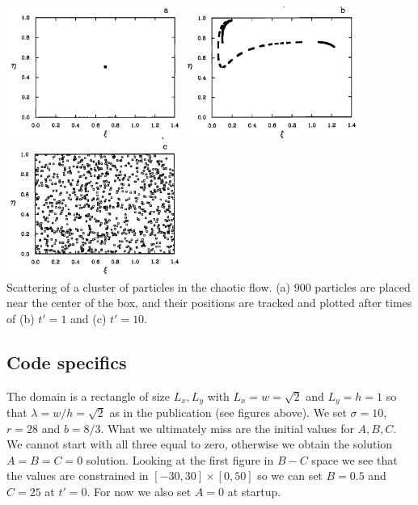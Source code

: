 \begin{center}
\includegraphics[width=5.7cm]{python_codes/fieldstone_156/images/ketu90e}
\includegraphics[width=5.7cm]{python_codes/fieldstone_156/images/ketu90f}
\includegraphics[width=5.7cm]{python_codes/fieldstone_156/images/ketu90g}\\
{
Scattering of a cluster of particles in the chaotic flow.
(a) 900 particles are placed near the center of the box, 
and their positions are tracked and plotted after times 
of (b) $t'=1$ and (c) $t'=10$.
}
\end{center}

\subsection*{Code specifics}


The domain is a rectangle of size $L_x,L_y$ with $L_x=w=\sqrt 2$ and $L_y=h=1$
so that $\lambda=w/h=\sqrt 2$ as in the publication (see figures above).
We set $\sigma=10$, $r=28$ and $b=8/3$. 
What we ultimately miss are the initial values for $A,B,C$. We cannot start
with all three equal to zero, otherwise we obtain the solution $A=B=C=0$ solution.
Looking at the first figure in $B-C$ space we see that the values are constrained in 
$[-30,30]\times[0,50]$ so we can set $B=0.5$ and $C=25$ at $t'=0$. 
For now we also set $A=0$ at startup. 

